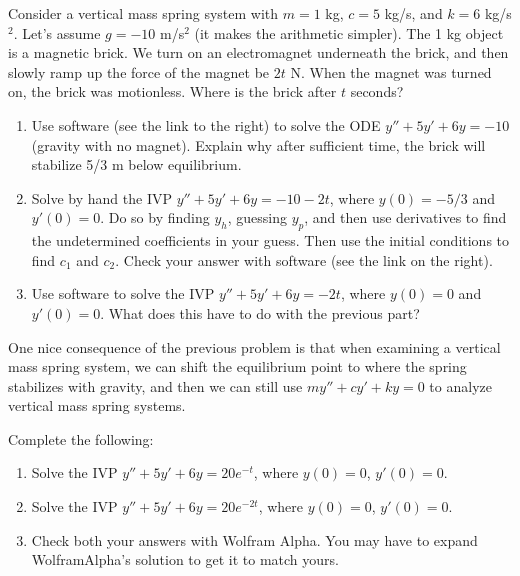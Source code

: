 \begin{problem}
 Consider a vertical mass spring system with $m=1$ kg, $c=5$ kg/s, and $k=6$ kg/s$^2$. Let's assume $g=-10$ m/s$^2$ (it makes the arithmetic simpler).   The 1 kg object is a magnetic brick. We turn on an electromagnet underneath the brick, and then slowly ramp up the force of the magnet be $2t$ N. When the magnet was turned on, the brick was motionless. Where is the brick after $t$ seconds?
\begin{enumerate}
 \item Use software (see the link to the right) to solve the ODE $y''+5y'+6y=-10$ (gravity with no magnet). Explain why after sufficient time, the brick will stabilize 5/3 m below equilibrium. 
 \item Solve by hand the IVP $y''+5y'+6y=-10-2t$, where $y(0)=-5/3$ and $y'(0)=0$. Do so by finding $y_h$, guessing $y_p$, and then use derivatives to find the undetermined coefficients in your guess. Then use the initial conditions to find $c_1$ and $c_2$. Check your answer with software (see the link on the right). 
 \item Use software to solve the IVP $y''+5y'+6y=-2t$, where $y(0)=0$ and $y'(0)=0$. What does this have to do with the previous part?
\end{enumerate}
\end{problem}

One nice consequence of the previous problem is that when examining a vertical mass spring system, we can shift the equilibrium point to where the spring stabilizes with gravity, and then we can still use $my''+cy'+ky=0$ to analyze vertical mass spring systems.  



\begin{problem}
 Complete the following:
\begin{enumerate}
 \item Solve the IVP $y''+5y'+6y=20 e^{-t}$, where $y(0)=0$, $y'(0)=0$. 
 \item Solve the IVP $y''+5y'+6y=20 e^{-2t}$, where $y(0)=0$, $y'(0)=0$. 
 \item Check both your answers with Wolfram Alpha. You may have to expand WolframAlpha's solution to get it to match yours.
\end{enumerate}
\end{problem}

